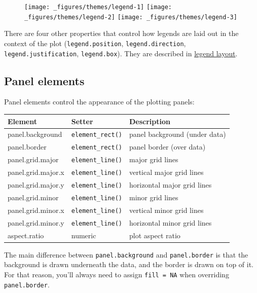 \begin{figure}[H]
  \texttt{[image: \_figures/themes/legend-1]}%
  \texttt{[image: \_figures/themes/legend-2]}%
  \texttt{[image: \_figures/themes/legend-3]}
\end{figure}

There are four other properties that control how legends are laid out in
the context of the plot (\texttt{legend.position},
\texttt{legend.direction}, \texttt{legend.justification},
\texttt{legend.box}). They are described in
\protect\hyperlink{sub:legend-layout}{legend layout}.

\subsection{Panel elements}\label{panel-elements}

 

Panel elements control the appearance of the plotting panels:

\begin{longtable}[c]{@{}lll@{}}
\toprule
Element & Setter & Description\tabularnewline
\midrule
\endhead
panel.background & \texttt{element\_rect()} & panel background (under
data)\tabularnewline
panel.border & \texttt{element\_rect()} & panel border (over
data)\tabularnewline
panel.grid.major & \texttt{element\_line()} & major grid
lines\tabularnewline
panel.grid.major.x & \texttt{element\_line()} & vertical major grid
lines\tabularnewline
panel.grid.major.y & \texttt{element\_line()} & horizontal major grid
lines\tabularnewline
panel.grid.minor & \texttt{element\_line()} & minor grid
lines\tabularnewline
panel.grid.minor.x & \texttt{element\_line()} & vertical minor grid
lines\tabularnewline
panel.grid.minor.y & \texttt{element\_line()} & horizontal minor grid
lines\tabularnewline
aspect.ratio & numeric & plot aspect ratio\tabularnewline
\bottomrule
\end{longtable}

The main difference between \texttt{panel.background} and
\texttt{panel.border} is that the background is drawn underneath the
data, and the border is drawn on top of it. For that reason, you'll
always need to assign \texttt{fill\ =\ NA} when overriding
\texttt{panel.border}.

